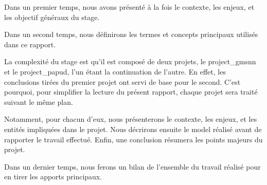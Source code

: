 
Dans un premier temps, nous avons présenté à la fois le contexte, les enjeux, et les objectif généraux du stage.

Dans un second temps, nous définirons les termes et concepts principaux utilisés dans ce rapport.

La complexité du stage est qu'il est composé de deux projets, le \gls{project_gmsnn} et le \gls{project_papud}, l'un étant la continuation de l'autre. En effet, les conclusions tirées du premier projet ont servi de base pour le second. C'est pourquoi, pour simplifier la lecture du présent rapport, chaque projet sera traité suivant le même plan.

Notamment, pour chacun d'eux, nous présenterons le contexte, les enjeux, et les entités impliquées dans le projet. Nous décrirons ensuite le \gls{model} réalisé avant de rapporter le travail effectué. Enfin, une conclusion résumera les points majeurs du projet.

Dans un dernier temps, nous ferons un bilan de l'ensemble du travail réalisé pour en tirer les apports principaux.



